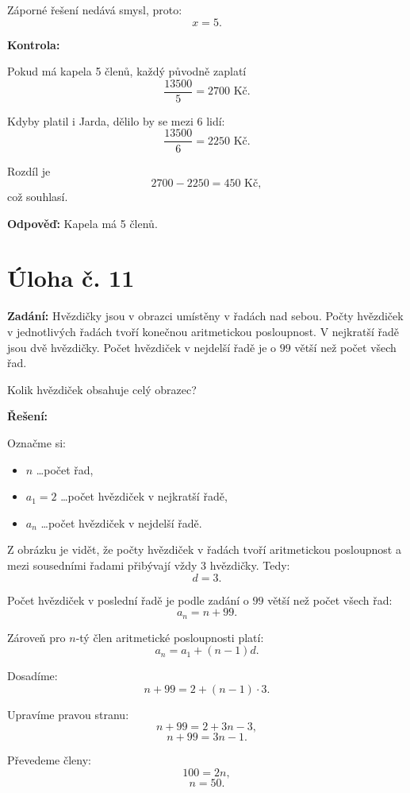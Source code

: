 \documentclass[12pt,a4paper]{article}
\begin{document}
Záporné řešení nedává smysl, proto:
\[
x=5.
\]

\bigskip

\textbf{Kontrola:}

Pokud má kapela 5 členů, každý původně zaplatí
\[
\frac{13500}{5}=2700\text{ Kč}.
\]

Kdyby platil i Jarda, dělilo by se mezi 6 lidí:
\[
\frac{13500}{6}=2250\text{ Kč}.
\]

Rozdíl je
\[
2700-2250=450\text{ Kč},
\]
což souhlasí.

\bigskip

\textbf{Odpověď:}  
Kapela má 5 členů.


\newpage
\section*{Úloha č. 11}

\textbf{Zadání:}  
Hvězdičky jsou v obrazci umístěny v řadách nad sebou. Počty hvězdiček v jednotlivých řadách tvoří konečnou aritmetickou posloupnost. V nejkratší řadě jsou dvě hvězdičky. Počet hvězdiček v nejdelší řadě je o \(99\) větší než počet všech řad.

Kolik hvězdiček obsahuje celý obrazec?

\bigskip

\textbf{Řešení:}

Označme si:
\begin{itemize}
    \item \(n\) \dots počet řad,
    \item \(a_1=2\) \dots počet hvězdiček v nejkratší řadě,
    \item \(a_n\) \dots počet hvězdiček v nejdelší řadě.
\end{itemize}

Z obrázku je vidět, že počty hvězdiček v řadách tvoří aritmetickou posloupnost a mezi sousedními řadami přibývají vždy 3 hvězdičky. Tedy:
\[
d=3.
\]

Počet hvězdiček v poslední řadě je podle zadání o \(99\) větší než počet všech řad:
\[
a_n=n+99.
\]

Zároveň pro \(n\)-tý člen aritmetické posloupnosti platí:
\[
a_n=a_1+(n-1)d.
\]

Dosadíme:
\[
n+99=2+(n-1)\cdot 3.
\]

Upravíme pravou stranu:
\[
n+99=2+3n-3,
\]
\[
n+99=3n-1.
\]

Převedeme členy:
\[
100=2n,
\]
\[
n=50.
\]
\end{document}
